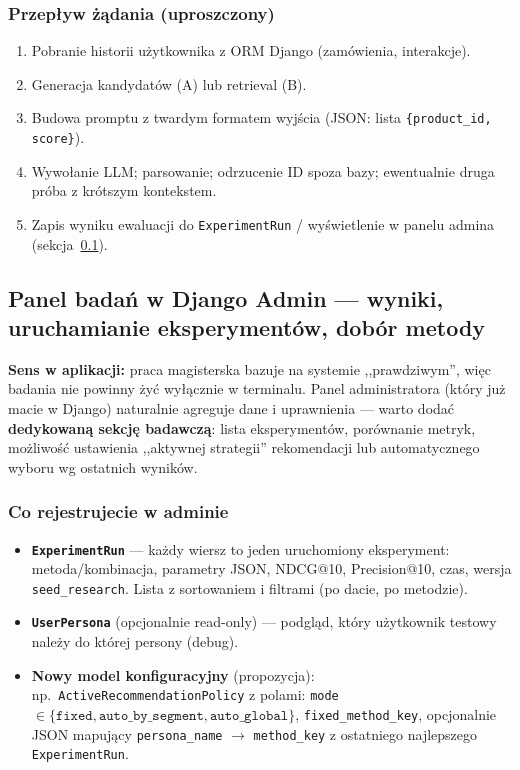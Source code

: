 \documentclass[a4paper,11pt]{article}
\newcommand{\code}[1]{\texttt{\small #1}}
\begin{document}
\subsubsection{Przepływ żądania (uproszczony)}

\begin{enumerate}[leftmargin=1.5em,itemsep=2pt]
  \item Pobranie historii użytkownika z ORM Django (zamówienia, interakcje).
  \item Generacja kandydatów (A) lub retrieval (B).
  \item Budowa promptu z twardym formatem wyjścia (JSON: lista \code{\{product\_id, score\}}).
  \item Wywołanie LLM; parsowanie; odrzucenie ID spoza bazy; ewentualnie druga próba z krótszym kontekstem.
  \item Zapis wyniku ewaluacji do \code{ExperimentRun} / wyświetlenie w panelu admina (sekcja~\ref{sec:admin-research}).
\end{enumerate}

\subsection{Panel badań w Django Admin --- wyniki, uruchamianie eksperymentów, dobór metody}\label{sec:admin-research}

\textbf{Sens w aplikacji:} praca magisterska bazuje na systemie ,,prawdziwym'', więc badania nie powinny żyć wyłącznie w terminalu. Panel administratora (który już macie w Django) naturalnie agreguje dane i uprawnienia --- warto dodać \textbf{dedykowaną sekcję badawczą}: lista eksperymentów, porównanie metryk, możliwość ustawienia ,,aktywnej strategii'' rekomendacji lub automatycznego wyboru wg ostatnich wyników.

\subsubsection{Co rejestrujecie w adminie}

\begin{itemize}[leftmargin=1.5em,itemsep=2pt]
  \item \textbf{\code{ExperimentRun}} --- każdy wiersz to jeden uruchomiony eksperyment: metoda/kombinacja, parametry JSON, NDCG@10, Precision@10, czas, wersja \texttt{seed\_research}. Lista z sortowaniem i filtrami (po dacie, po metodzie).
  \item \textbf{\code{UserPersona}} (opcjonalnie read-only) --- podgląd, który użytkownik testowy należy do której persony (debug).
  \item \textbf{Nowy model konfiguracyjny} (propozycja): np.\ \code{ActiveRecommendationPolicy} z polami: \code{mode} $\in \{\texttt{fixed}, \texttt{auto\_by\_segment}, \texttt{auto\_global}\}$, \code{fixed\_method\_key}, opcjonalnie JSON mapujący \texttt{persona\_name} $\to$ \texttt{method\_key} z ostatniego najlepszego \code{ExperimentRun}.
\end{itemize}
\end{document}
